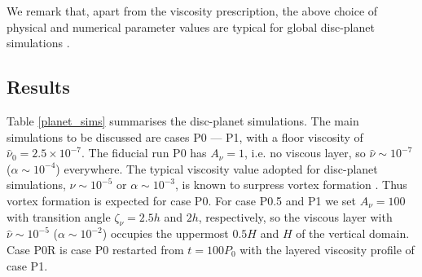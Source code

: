 We remark that, apart from the viscosity prescription, the above
choice of physical and numerical parameter values are typical for
global disc-planet simulations \citep[e.g.][]{valborro06,mignone12}.    




\subsection{Results}
Table \ref{planet_sims} summarises the disc-planet simulations. 
The main simulations to be discussed are cases P0 --- P1, with a floor
viscosity of $\hat{\nu}_0=2.5\times10^{-7}$. 
The fiducial run P0 has $A_\nu=1$, i.e. no viscous layer, so 
$\hat{\nu}\sim 10^{-7}$ ($\alpha\sim 10^{-4}$) everywhere. 
The typical viscosity value adopted for disc-planet simulations,
$\hat{\nu}\sim 10^{-5}$ or $\alpha\sim 10^{-3}$, is known to surpress vortex formation
\citep{valborro07, mudryk09}. Thus vortex formation is expected for
case P0. For case P0.5 and P1 we set $A_\nu=100$ with transition angle $\zeta_\nu=2.5h$ and
$2h$, respectively, so the viscous layer with $\hat{\nu}\sim10^{-5}$
($\alpha\sim10^{-2}$) occupies the uppermost $0.5H$ and $H$ of the vertical
domain. Case P0R is case P0 restarted from 
$t=100P_0$ with the layered viscosity profile of case P1. 
 

